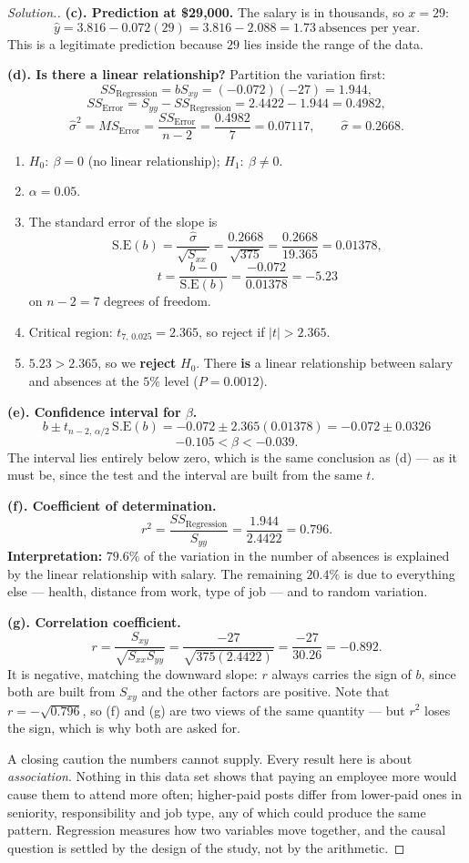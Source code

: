 \documentclass[11pt,a4paper]{article}
\theoremstyle{definition}
\newenvironment{solution}
  {\renewcommand{\qedsymbol}{}\begin{proof}[\textit{Solution}.]}
  {\end{proof}}
\begin{document}
\begin{solution}
\textbf{(c). Prediction at \$29,000.} The salary is in thousands, so $x=29$:
\[\hat{y}=3.816-0.072(29)=3.816-2.088=1.73\ \text{absences per year}.\]
This is a legitimate prediction because $29$ lies inside the range of the data.

\textbf{(d). Is there a linear relationship?} Partition the variation first:
\[SS_{\text{Regression}}=bS_{xy}=(-0.072)(-27)=1.944,\]
\[SS_{\text{Error}}=S_{yy}-SS_{\text{Regression}}=2.4422-1.944=0.4982,\]
\[\hat{\sigma}^2=MS_{\text{Error}}=\frac{SS_{\text{Error}}}{n-2}=\frac{0.4982}{7}=0.07117,
\qquad \hat{\sigma}=0.2668.\]
\begin{enumerate}
\item $H_0:\ \beta=0$ (no linear relationship); $H_1:\ \beta\neq 0$.
\item $\alpha=0.05$.
\item The standard error of the slope is
\[\text{S.E}(b)=\frac{\hat{\sigma}}{\sqrt{S_{xx}}}=\frac{0.2668}{\sqrt{375}}
=\frac{0.2668}{19.365}=0.01378,\]
\[t=\frac{b-0}{\text{S.E}(b)}=\frac{-0.072}{0.01378}=-5.23\]
on $n-2=7$ degrees of freedom.
\item Critical region: $t_{7,\,0.025}=2.365$, so reject if $|t|>2.365$.
\item $5.23>2.365$, so we \textbf{reject} $H_0$. There \textbf{is} a linear relationship
between salary and absences at the $5\%$ level ($P=0.0012$).
\end{enumerate}

\textbf{(e). Confidence interval for $\beta$.}
\[b\pm t_{n-2,\,\alpha/2}\,\text{S.E}(b)=-0.072\pm 2.365(0.01378)=-0.072\pm 0.0326\]
\[-0.105<\beta<-0.039.\]
The interval lies entirely below zero, which is the same conclusion as (d) --- as it must
be, since the test and the interval are built from the same $t$.

\textbf{(f). Coefficient of determination.}
\[r^2=\frac{SS_{\text{Regression}}}{S_{yy}}=\frac{1.944}{2.4422}=0.796.\]
\textbf{Interpretation:} $79.6\%$ of the variation in the number of absences is explained by
the linear relationship with salary. The remaining $20.4\%$ is due to everything else ---
health, distance from work, type of job --- and to random variation.

\textbf{(g). Correlation coefficient.}
\[r=\frac{S_{xy}}{\sqrt{S_{xx}S_{yy}}}=\frac{-27}{\sqrt{375(2.4422)}}=\frac{-27}{30.26}=-0.892.\]
It is negative, matching the downward slope: $r$ always carries the sign of $b$, since both
are built from $S_{xy}$ and the other factors are positive. Note that $r=-\sqrt{0.796}$, so
(f) and (g) are two views of the same quantity --- but $r^2$ loses the sign, which is why
both are asked for.

A closing caution the numbers cannot supply. Every result here is about
\emph{association}. Nothing in this data set shows that paying an employee more would cause
them to attend more often; higher-paid posts differ from lower-paid ones in seniority,
responsibility and job type, any of which could produce the same pattern. Regression
measures how two variables move together, and the causal question is settled by the design
of the study, not by the arithmetic.
\end{solution}
\end{document}
